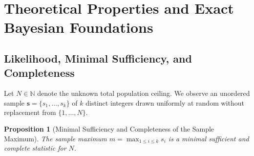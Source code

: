 \documentclass[10pt,a4paper]{article}
\newtheorem{proposition}{Proposition}
\begin{document}
\section{Theoretical Properties and Exact Bayesian Foundations}

\subsection{Likelihood, Minimal Sufficiency, and Completeness}
Let $N \in \mathbb{N}$ denote the unknown total population ceiling. We observe an unordered sample $\mathbf{s} = \{s_1, \dots, s_k\}$ of $k$ distinct integers drawn uniformly at random without replacement from $\{1, \dots, N\}$. 

\begin{proposition}[Minimal Sufficiency and Completeness of the Sample Maximum]
The sample maximum $m = \max_{1 \le i \le k} s_i$ is a minimal sufficient and complete statistic for $N$.
\end{proposition}
\end{document}

